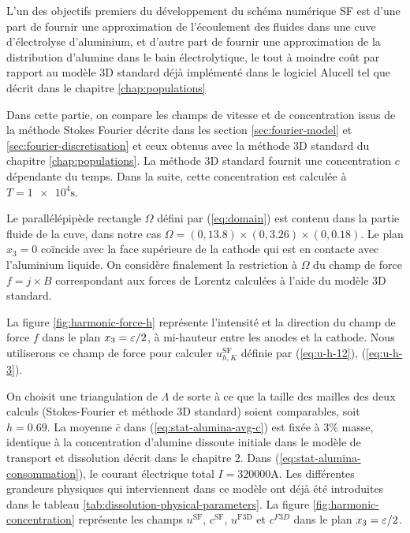 L'un des objectifs premiers du développement du schéma numérique
SF est d'une part de fournir une approximation de l'écoulement des
fluides dans une cuve d'électrolyse d'aluminium, et d'autre part
de fournir une approximation de la distribution d'alumine dans le bain
électrolytique, le tout à moindre coût par rapport au modèle
3D standard déjà implémenté dans le logiciel Alucell tel que décrit
dans le chapitre \ref{chap:populations}

Dans cette partie, on compare les champs de vitesse et de
concentration issus de la méthode Stokes Fourier décrite dans les
section \ref{sec:fourier-model} et \ref{sec:fourier-discretisation} et
ceux obtenus avec la méthode 3D standard du chapitre
\ref{chap:populations}. La méthode 3D standard fournit une
concentration $c$ dépendante du temps. Dans la suite, cette
concentration est calculée à $T = \num{1e4}\si{\second}$.

Le parallélépipède rectangle $\Omega$ défini par (\ref{eq:domain}) est
contenu dans la partie fluide de la cuve, dans notre cas $\Omega = (0,
\num{13.8})\times(0,\num{3.26})\times(0,\num{0.18})$. Le plan $x_3 =
0$ coïncide avec la face supérieure de la cathode qui est en contacte
avec l'aluminium liquide. On considère finalement la restriction à
$\Omega$ du champ de force $f = j\times B$ correspondant aux forces de
Lorentz calculées à l'aide du modèle 3D standard.

La figure \ref{fig:harmonic-force-h} représente l'intensité et la
direction du champ de force $f$ dans le plan $x_3 = \varepsilon / 2$,
à mi-hauteur entre les anodes et la cathode. Nous utiliserons ce champ
de force pour calculer $u_{h,K}^\mathrm{SF}$ définie par
(\ref{eq:u-h-12}), (\ref{eq:u-h-3}).

On choisit une triangulation de $\Lambda$ de sorte à ce que la taille
des mailles des deux calculs (Stokes-Fourier et méthode 3D standard)
soient comparables, soit $h = \num{0.69}$. La moyenne $\bar{c}$ dans
(\ref{eq:stat-alumina-avg-c}) est fixée à 3\% masse, identique à la
concentration d'alumine dissoute initiale dans le modèle de transport
et dissolution décrit dans le chapitre 2. Dans
(\ref{eq:stat-alumina-consommation}), le courant électrique total $I =
\num{320000} \si{\ampere}$. Les différentes grandeurs physiques qui
interviennent dans ce modèle ont déjà été introduites dans le tableau
\ref{tab:dissolution-physical-parameters}. La figure
\ref{fig:harmonic-concentration} représente les champs
$u^{\mathrm{SF}}$, $c^\mathrm{SF}$, $u^\mathrm{F3D}$ et $c^{F3D}$ dans
le plan $x_3 = \varepsilon / 2$.

